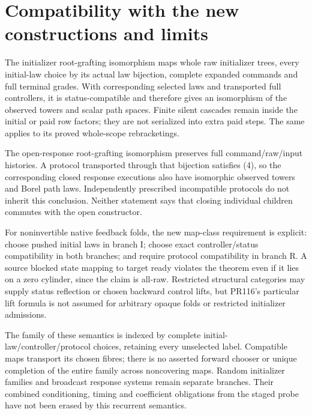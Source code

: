 \documentclass[11pt]{article}
\begin{document}
\section{Compatibility with the new constructions and limits}
The initializer root-grafting isomorphism maps whole raw initializer trees, every initial-law choice by its actual law bijection, complete expanded commands and full terminal grades. With corresponding selected laws and transported full controllers, it is status-compatible and therefore gives an isomorphism of the observed towers and scalar path spaces. Finite silent cascades remain inside the initial or paid row factors; they are not serialized into extra paid steps. The same applies to its proved whole-scope rebracketings.

The open-response root-grafting isomorphism preserves full command/raw/input histories. A protocol transported through that bijection satisfies (4), so the corresponding closed response executions also have isomorphic observed towers and Borel path laws. Independently prescribed incompatible protocols do not inherit this conclusion. Neither statement says that closing individual children commutes with the open constructor.

For noninvertible native feedback folds, the new map-class requirement is explicit: choose pushed initial laws in branch I; choose exact controller/status compatibility in both branches; and require protocol compatibility in branch R. A source blocked state mapping to target ready violates the theorem even if it lies on a zero cylinder, since the claim is all-raw. Restricted structural categories may supply status reflection or chosen backward control lifts, but PR116's particular lift formula is not assumed for arbitrary opaque folds or restricted initializer admissions.

The family of these semantics is indexed by complete initial-law/controller/protocol choices, retaining every unselected label. Compatible maps transport its chosen fibres; there is no asserted forward chooser or unique completion of the entire family across noncovering maps. Random initializer families and broadcast response systems remain separate branches. Their combined conditioning, timing and coefficient obligations from the staged probe have not been erased by this recurrent semantics.
\end{document}
